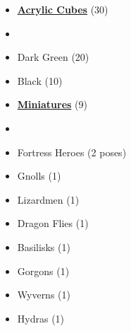 \begin{multicols*}{3}
\begin{itemize}[leftmargin=0pt, label={}, noitemsep]
  \item \textbf{\small{\underline{Acrylic Cubes}}} (30)
  \item
  \item Dark Green (20)
  \item Black (10)
\end{itemize}

\begin{itemize}[leftmargin=0pt, label={}, noitemsep]
  \item \textbf{\small{\underline{Miniatures}}} (9)
  \item
  \item Fortress Heroes (2 poses)
  \item Gnolls (1)
  \item Lizardmen (1)
  \item Dragon Flies (1)
  \item Basilisks (1)
  \item Gorgons (1)
  \item Wyverns (1)
  \item Hydras (1)
\end{itemize}

\columnbreak


\end{multicols*}
